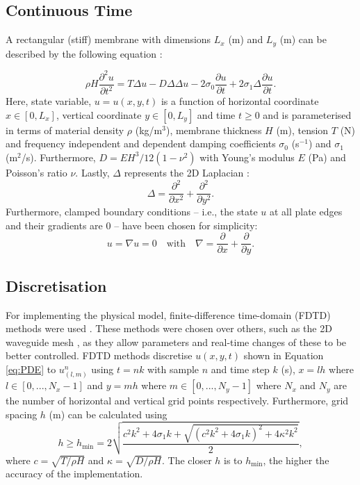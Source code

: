    \subsection{Continuous Time}
    A rectangular (stiff) membrane with dimensions $L_x$ (m) and $L_y$ (m) can be described by the following equation \cite{bilbao2009numerical}:
    
    \begin{equation}\label{eq:PDE}
    \rho H\frac{\partial^2u}{\partial t^2} = T\Delta u - D\Delta\Delta u - 2 \sigma_0\frac{\partial u}{\partial t} + 2 \sigma_1 \Delta \frac{\partial u}{\partial t}.
    \end{equation}
    Here, state variable, $u = u(x,y,t)$ is a function of horizontal coordinate $x \in [0, L_x]$, vertical coordinate $y \in [0, L_y]$ and time $t\geq0$ and is parameterised in terms of material density $\rho$ (kg/m$^3$), membrane thickness $H$ (m), tension $T$ (N) and frequency independent and dependent damping coefficients $\sigma_0$ (s$^{-1}$) and $\sigma_1$ (m$^2$/s). Furthermore, $D = EH^3/12(1-\nu^2)$ with Young's modulus $E$ (Pa) and Poisson's ratio $\nu$. Lastly, $\Delta$ represents the 2D Laplacian \cite{bilbao2009numerical}:
    \begin{equation}
        \Delta = \frac{\partial^2}{\partial x^2} + \frac{\partial^2}{\partial y^2}.
    \end{equation}
    Furthermore, clamped boundary conditions -- i.e., the state $u$ at all plate edges and their gradients are 0 -- have been chosen for simplicity:
    \begin{equation}
        u = \nabla u = 0 \quad \text{with} \quad \nabla = \frac{\partial}{\partial x} + \frac{\partial}{\partial y}.
    \end{equation}
    \subsection{Discretisation}
    For implementing the physical model, finite-difference time-domain (FDTD) methods were used \cite{bilbao2009numerical}. These methods were chosen over others, such as the 2D waveguide mesh \cite{Duyne1993}, as they allow parameters and real-time changes of these to be better controlled. FDTD methods discretise $u(x,y,t)$ shown in Equation \eqref{eq:PDE} to $u_{(l,m)}^n$ using $t = nk$ with sample $n$ and time step $k$ (s), $x=lh$ where $l \in [0, ..., N_x-1]$ and $y=mh$ where $m \in [0, ..., N_y-1]$ where $N_x$ and $N_y$ are the number of horizontal and vertical grid points respectively. Furthermore, grid spacing $h$ (m) can be calculated using 
    \begin{equation}\label{eq:h}
        h \geq h_\text{min} =  2\sqrt{\frac{c^2k^2 + 4\sigma_1k + \sqrt{(c^2k^2 + 4\sigma_1k)^2 + 4\kappa^2 k^2} }{2}},
    \end{equation}
    where $c = \sqrt{T/\rho H}$ and $\kappa = \sqrt{D/\rho H}$. The closer $h$ is to $h_\text{min}$, the higher the accuracy of the implementation.
    

